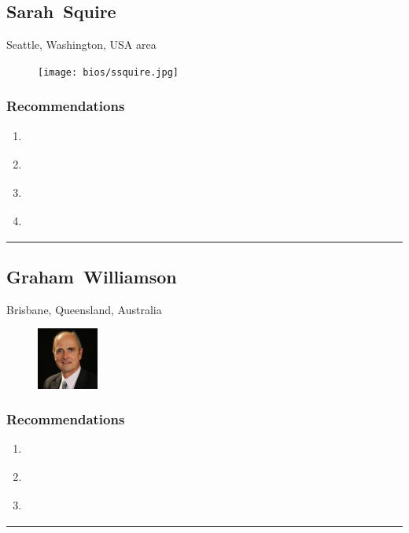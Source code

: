 \subsection{Sarah~Squire} \textsf{Seattle, Washington, USA area} \par \setlength{\columnsep}{0pt} \begin{figure} \centering \texttt{[image: bios/ssquire.jpg]} \end{figure} \textsf{  } \WFclear \subsubsection{Recommendations}\begin{enumerate}
\item \cite{Gilman2017}
\item \cite{Hardt2005}
\item \cite{NSTIC2011}
\item \cite{Richer2017}
\end{enumerate}\noindent\rule{\textwidth}{0.2pt}

\subsection{Graham~Williamson} \textsf{Brisbane, Queensland, Australia} \par \setlength{\columnsep}{0pt} \begin{figure} \centering \includegraphics[width=0.18\textwidth]{bios/gwilliamson.jpg} \end{figure} \textsf{  } \WFclear \subsubsection{Recommendations}\begin{enumerate}
\item \cite{DTA-AUS2018}
\item \cite{NIST-USA2017}
\item \cite{Williamson2017}
\end{enumerate}\noindent\rule{\textwidth}{0.2pt}

